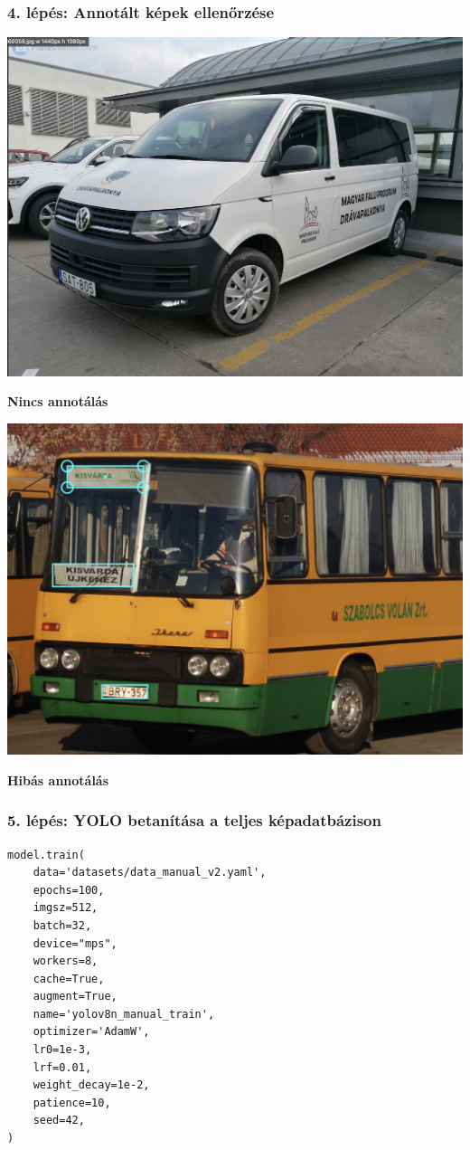 \documentclass[aspectratio=169]{beamer}
\begin{document}
\begin{frame}
	\frametitle{4. lépés: Annotált képek ellenőrzése}

	\begin{minipage}{.5\textwidth}
		\centering
		\includegraphics[height=.6\textwidth]{images/wrong_annotation.png}

		\textbf{Nincs annotálás}
	\end{minipage}\begin{minipage}{.5\textwidth}
		\centering
		\includegraphics[height=.6\textwidth]{images/no_annotation.png}

		\textbf{Hibás annotálás}
	\end{minipage}
\end{frame}

\begin{frame}[fragile]
	\frametitle{5. lépés: YOLO betanítása a teljes képadatbázison}

	\begin{verbatim}
model.train(
    data='datasets/data_manual_v2.yaml',
    epochs=100,                       
    imgsz=512,                        
    batch=32,                         
    device="mps",                     
    workers=8,                        
    cache=True,                       
    augment=True,                     
    name='yolov8n_manual_train',      
    optimizer='AdamW',                
    lr0=1e-3,                         
    lrf=0.01,                         
    weight_decay=1e-2,                
    patience=10,                      
    seed=42,                          
)
\end{verbatim}

\end{frame}
\end{document}
